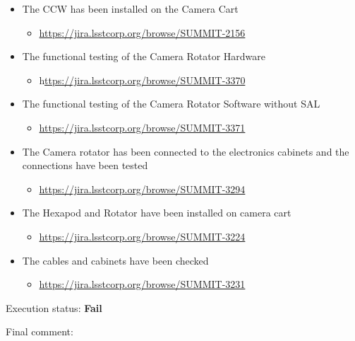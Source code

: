 \documentclass[SE,lsstdraft,STR,toc]{lsstdoc}
\providecommand{\tightlist}{
  \setlength{\itemsep}{0pt}\setlength{\parskip}{0pt}}
\begin{document}
\begin{itemize}
\tightlist
\item
  The CCW has been installed on the Camera Cart

  \begin{itemize}
  \tightlist
  \item
    \url{https://jira.lsstcorp.org/browse/SUMMIT-2156}
  \end{itemize}
\item
  The functional testing of the Camera Rotator Hardware~

  \begin{itemize}
  \tightlist
  \item
    h\href{https://jira.lsstcorp.org/browse/SUMMIT-3370}{ttps://jira.lsstcorp.org/browse/SUMMIT-3370}
  \end{itemize}
\item
  The functional testing of the Camera Rotator Software without SAL

  \begin{itemize}
  \tightlist
  \item
    \url{https://jira.lsstcorp.org/browse/SUMMIT-3371}
  \end{itemize}
\item
  The Camera rotator has been connected to the electronics cabinets and
  the connections have been tested

  \begin{itemize}
  \tightlist
  \item
    \url{https://jira.lsstcorp.org/browse/SUMMIT-3294}
  \end{itemize}
\item
  The Hexapod and Rotator have been installed on camera cart

  \begin{itemize}
  \tightlist
  \item
    \url{https://jira.lsstcorp.org/browse/SUMMIT-3224}
  \end{itemize}
\item
  The cables and cabinets have been checked

  \begin{itemize}
  \tightlist
  \item
    \url{https://jira.lsstcorp.org/browse/SUMMIT-3231}
  \end{itemize}
\end{itemize}


Execution status: {\bf Fail }

Final comment:\\
\end{document}
